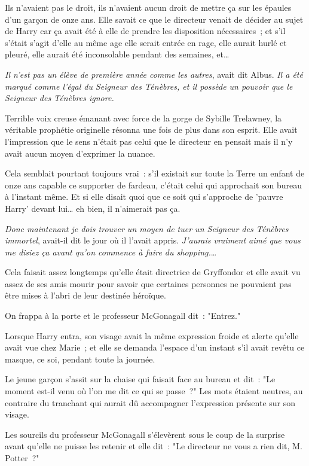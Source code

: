 Ils n'avaient pas le droit, ils n'avaient aucun droit de mettre ça sur les épaules d'un garçon de onze ans. Elle savait ce que le directeur venait de décider au sujet de Harry car ça avait été à elle de prendre les disposition nécessaires~; et s'il s'était s'agit d'elle au même age elle serait entrée en rage, elle aurait hurlé et pleuré, elle aurait été inconsolable pendant des semaines, et…

\emph{Il n'est pas un élève de première année comme les autres}, avait dit Albus. \emph{Il a été marqué comme l'égal du Seigneur des Ténèbres, et il possède un pouvoir que le Seigneur des Ténèbres ignore.}

Terrible voix creuse émanant avec force de la gorge de Sybille Trelawney, la véritable prophétie originelle résonna une fois de plus dans son esprit. Elle avait l'impression que le sens n'était pas celui que le directeur en pensait mais il n’y avait aucun moyen d'exprimer la nuance.

Cela semblait pourtant toujours vrai~: s'il existait sur toute la Terre un enfant de onze ans capable ce supporter de fardeau, c'était celui qui approchait son bureau à l'instant même. Et si elle disait quoi que ce soit qui s'approche de 'pauvre Harry' devant lui… eh bien, il n'aimerait pas ça.

\emph{Donc maintenant je dois trouver un moyen de tuer un Seigneur des Ténèbres immortel}, avait-il dit le jour où il l'avait appris. \emph{J'aurais vraiment aimé que vous me disiez ça avant qu'on commence à faire du shopping.}…

Cela faisait assez longtemps qu'elle était directrice de Gryffondor et elle avait vu assez de ses amis mourir pour savoir que certaines personnes ne pouvaient pas être mises à l'abri de leur destinée héroïque.

On frappa à la porte et le professeur McGonagall dit~: "Entrez."

Lorsque Harry entra, son visage avait la même expression froide et alerte qu'elle avait vue chez Marie~; et elle se demanda l'espace d'un instant s'il avait revêtu ce masque, ce soi, pendant toute la journée.

Le jeune garçon s'assit sur la chaise qui faisait face au bureau et dit~: "Le moment est-il venu où l'on me dit ce qui se passe~?" Les mots étaient neutres, au contraire du tranchant qui aurait dû accompagner l'expression présente sur son visage.

Les sourcils du professeur McGonagall s'élevèrent sous le coup de la surprise avant qu'elle ne puisse les retenir et elle dit~: "Le directeur ne vous a rien dit, M. Potter~?"

